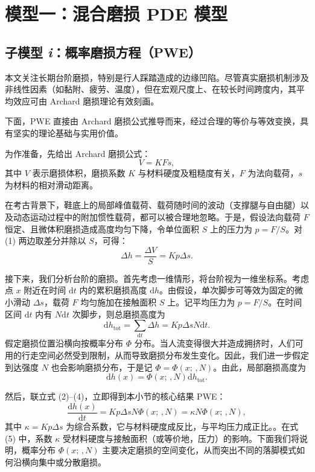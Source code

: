 \documentclass[11pt,a4paper,fontset=windows]{ctexart}
\newcommand{\dd}{\mathrm{d}}
\begin{document}
\newpage

\section{模型一：混合磨损 PDE 模型}

\subsection{子模型 \textit{i}：概率磨损方程（PWE）}

本文关注长期台阶磨损，特别是行人踩踏造成的边缘凹陷。尽管真实磨损机制涉及非线性因素（如黏附、疲劳、温度），但在宏观尺度上、在较长时间跨度内，其平均效应可由 Archard 磨损理论\cite{3}有效刻画。

下面，PWE 直接由 Archard 磨损公式推导而来，经过合理的等价与等效变换，具有坚实的理论基础与实用价值。

为作准备，先给出 Archard 磨损公式：
\begin{equation}
V=KFs,
\end{equation}
其中 $V$ 表示磨损体积，磨损系数 $K$ 与材料硬度及粗糙度有关，$F$ 为法向载荷，$s$ 为材料的相对滑动距离。

在考古背景下，鞋底上的局部峰值载荷、载荷随时间的波动（支撑腿与自由腿）以及动态运动过程中的附加惯性载荷，都可以被合理地忽略。于是，假设法向载荷 $F$ 恒定、且微体积磨损造成高度均匀下降，令单位面积 $S$ 上的压力为 $p=F/S$。对 (1) 两边取差分并除以 $S$，可得：
\begin{equation}
\Delta h=\frac{\Delta V}{S}=Kp\Delta s.
\end{equation}

接下来，我们分析台阶的磨损。首先考虑一维情形，将台阶视为一维坐标系。考虑点 $x$ 附近在时间 $\dd t$ 内的累积磨损高度 $\dd h$。由假设，单次脚步可等效为固定的微小滑动 $\Delta s$，载荷 $F$ 均匀施加在接触面积 $S$ 上。记平均压力为 $p=F/S$。在时间区间 $\dd t$ 内有 $N\dd t$ 次脚步，则总磨损高度为
\begin{equation}
\dd h_{\text{tot}}=\sum_{\dd t}\Delta h=Kp\Delta sN\dd t.
\end{equation}
假定磨损位置沿横向按概率分布 $\Phi$ 分布。当人流变得很大并造成拥挤时，人们可用的行走空间必然受到限制，从而导致磨损分布发生变化。因此，我们进一步假定到达强度 $N$ 也会影响磨损分布，于是记 $\Phi=\Phi(x;\,,N)$。由此，局部磨损高度为
\begin{equation}
\dd h(x)=\Phi(x;\,,N)\dd h_{\text{tot}}.
\end{equation}

然后，联立式 (2)--(4)，立即得到本小节的核心结果 PWE：
\begin{equation}
\frac{\dd h(x)}{\dd t}=Kp\Delta sN\Phi(x;\,,N)=\kappa N\Phi(x;\,,N),
\end{equation}
其中 $\kappa=Kp\Delta s$ 为综合系数，它与材料硬度成反比，与平均压力成正比。。在式 (5) 中，系数 $\kappa$ 受材料硬度与接触面积（或等价地，压力）的影响。下面我们将说明，概率分布 $\Phi(x;\,,N)$ 主要决定磨损的空间变化，从而突出不同的落脚模式如何沿横向集中或分散磨损。
\end{document}
